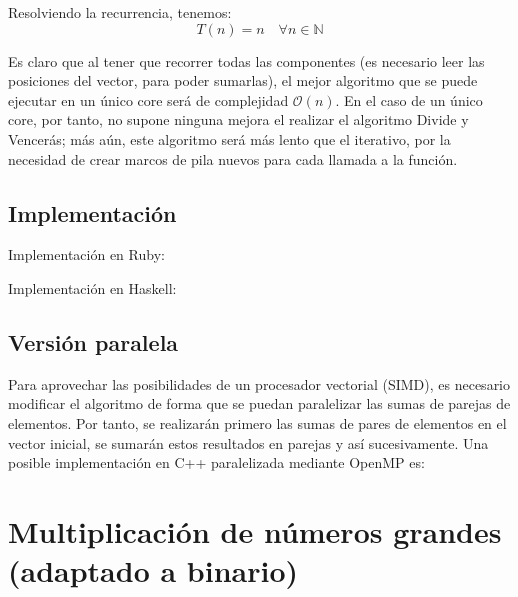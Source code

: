 \documentclass[a4paper, 11pt]{article} %
\begin{document}
Resolviendo la recurrencia, tenemos:
\begin{equation}
 T(n)=n\quad \forall n\in \mathbb{N}
\end{equation}

Es claro que al tener que recorrer todas las componentes (es necesario leer las posiciones
del vector, para poder sumarlas), el mejor algoritmo que se puede ejecutar en un único core 
será de complejidad $\mathcal{O}(n)$. En el caso de un único core, por tanto, no supone ninguna
mejora el realizar el algoritmo Divide y Vencerás; más aún, este algoritmo será más lento que el
iterativo, por la necesidad de crear marcos de pila nuevos para cada llamada a la función.\\


\subsection{Implementación}
Implementación en Ruby:

\small
\texttt{}
\normalsize

Implementación en Haskell:

\small
\texttt{}
\normalsize

\subsection{Versión paralela}
Para aprovechar las posibilidades de un procesador vectorial (SIMD), es necesario modificar el algoritmo de forma que se puedan paralelizar las sumas de parejas de elementos. Por tanto, se realizarán primero las sumas de pares de elementos en el vector inicial, se sumarán estos resultados en parejas y así sucesivamente. Una posible implementación en C++ paralelizada mediante OpenMP es:

\small
\texttt{}
\normalsize

\section {Multiplicación de números grandes (adaptado a binario)}
\end{document}
